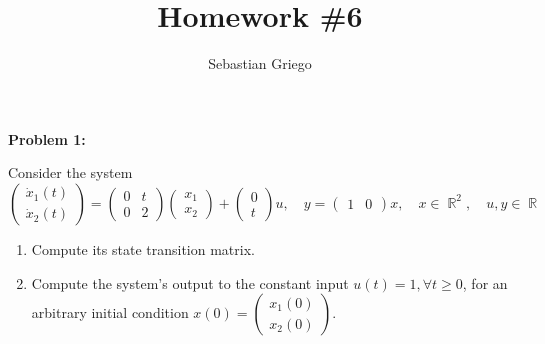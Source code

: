 \documentclass[12pt]{article}
\DeclareMathOperator{\RR}{\mathbb{R}}
\newenvironment{problem}[1]{
    \textbf{Problem #1:}
}{
    \rmfamily \vspace{1em}
}
\begin{document}
\title{Homework \#6}  %
\author{Sebastian Griego}  %
\maketitle

\begin{problem}{1}
    Consider the system
    \[
        \begin{pmatrix}
            \dot{x}_1(t) \\
            \dot{x}_2(t)
        \end{pmatrix} = \begin{pmatrix}
            0 & t \\
            0 & 2
        \end{pmatrix}\begin{pmatrix}
            x_1 \\
            x_2
        \end{pmatrix} + \begin{pmatrix}
            0 \\
            t
        \end{pmatrix} u, \quad y = \begin{pmatrix}
            1 & 0 \end{pmatrix} x, \quad x \in \RR^2, \quad u,y \in \RR
    \]
    \begin{enumerate}[label=\alph*)]
        \item Compute its state transition matrix.
        \item Compute the system’s output to the constant input \(u(t) = 1, \forall t \geq 0\), for an arbitrary initial condition \(x(0) = \begin{pmatrix}
            x_1(0) \\
            x_2(0)
        \end{pmatrix}\).
    \end{enumerate}
\end{problem}
\end{document}

